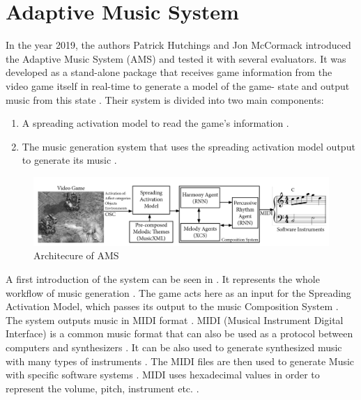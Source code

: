 \section{Adaptive Music System}

In the year 2019, the authors Patrick Hutchings and Jon McCormack
introduced the Adaptive Music System (AMS) \cite{hutMcCormAms} 
and tested it with several evaluators. It was developed as a
stand-alone package that receives game information from the
video game itself in real-time to generate a model of the game-
state and output music from this state \cite{hutMcCormAms}.
Their system is divided into two main components: 
\begin{enumerate}[label=\arabic*)]
    \item A spreading activation model to read the game's information \cite{hutMcCormAms}.
    \item The music generation system that uses the spreading activation model output to generate its music \cite{hutMcCormAms}. 
\end{enumerate}
\begin{figure}[h]
    \centering
    \includegraphics[width=\linewidth]{images/ams_architecture.png}
    \caption{Architecure of AMS \cite{hutMcCormAms}}
    \label{fig:ams_architecture}
\end{figure}
A first introduction of the system can be seen in .
It represents the whole workflow of music generation \cite{hutMcCormAms}. The game 
acts here as an input for the Spreading Activation Model, which passes its output
to the music Composition System \cite{hutMcCormAms}. The system outputs music in
MIDI format \cite{hutMcCormAms}. MIDI (Musical Instrument Digital Interface) is a
common music format \cite{midi_explanation} that can also be used as a protocol
between computers and synthesizers \cite{midi_explanation}. It can be also used to 
generate synthesized music \cite{midi_explanation} with many types of instruments \cite{midi_general}.
The MIDI files are then used to generate Music with specific software systems \cite{hutMcCormAms}. MIDI uses hexadecimal values in order
to represent the volume, pitch, instrument etc. \cite{midi_general}\cite{midi_explanation}.

